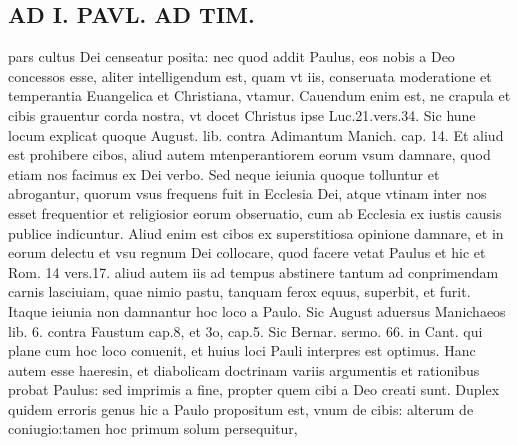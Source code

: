 \documentclass{article}
\begin{document}
\begin{pages}
\section*{AD I. PAVL. AD TIM. }
\marginpar{[ p.180 ]}\pstart pars cultus Dei censeatur posita: nec quod addit Paulus, eos nobis a Deo concessos esse, aliter intelligendum est, quam vt iis, conseruata moderatione et temperantia Euangelica et Christiana, vtamur. Cauendum enim est, ne crapula et cibis grauentur corda nostra, vt docet Christus ipse Luc.21.vers.34. Sic hune locum explicat quoque August. lib.  contra Adimantum Manich. cap. 14. Et aliud est prohibere cibos, aliud autem mtenperantiorem eorum vsum damnare, quod etiam nos facimus ex Dei verbo. Sed neque ieiunia quoque tolluntur et abrogantur, quorum vsus frequens fuit in Ecclesia Dei, atque vtinam inter nos esset frequentior et religiosior eorum obseruatio, cum ab Ecclesia ex iustis causis publice indicuntur. Aliud enim est cibos ex superstitiosa opinione damnare, et in eorum delectu et vsu regnum Dei collocare, quod facere vetat Paulus et hic et Rom. 14 vers.17. aliud autem iis ad tempus abstinere tantum ad conprimendam carnis lasciuiam, quae nimio pastu, tanquam ferox equus, superbit, et furit. Itaque ieiunia non damnantur hoc loco a Paulo. Sic August aduersus Manichaeos lib. 6. contra Faustum cap.8, et 3o, cap.5. Sic Bernar. sermo. 66. in Cant. qui plane cum hoc loco conuenit, et huius loci Pauli interpres est optimus. Hanc autem esse haeresin, et diabolicam doctrinam variis argumentis et rationibus probat Paulus: sed imprimis a fine, propter quem cibi a Deo creati sunt. Duplex quidem erroris genus hic a Paulo propositum est, vnum de cibis: alterum de coniugio:tamen hoc primum solum persequitur,  \pend

\end{pages}
\end{document}
